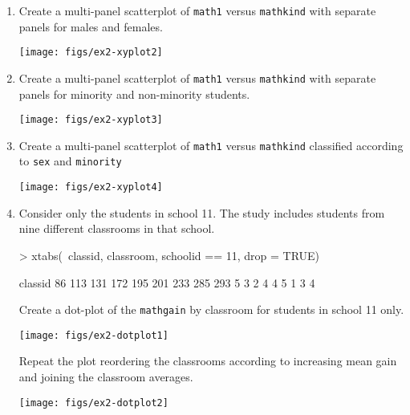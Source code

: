 \documentclass[11pt,a4rpaper]{article}
\newcommand{\code}[1]{\texttt{\small #1}}
\begin{document}
\begin{enumerate}
\item Create a multi-panel scatterplot of \code{math1} versus
  \code{mathkind} with separate panels for males and females.
\begin{center}
\texttt{[image: figs/ex2-xyplot2]}
\end{center}
\item Create a multi-panel scatterplot of \code{math1} versus
  \code{mathkind} with separate panels for minority and non-minority
  students.
\begin{center}
\texttt{[image: figs/ex2-xyplot3]}
\end{center}
\item Create a multi-panel scatterplot of \code{math1} versus
  \code{mathkind} classified according to \code{sex} and \code{minority}
\begin{center}
\texttt{[image: figs/ex2-xyplot4]}
\end{center}
\item Consider only the students in school 11.  The study includes
  students from nine different classrooms in that school.
\begin{Schunk}
\begin{Sinput}
> xtabs(~classid, classroom, schoolid == 11, drop = TRUE)
\end{Sinput}
\begin{Soutput}
classid
 86 113 131 172 195 201 233 285 293 
  5   3   2   4   4   5   1   3   4 
\end{Soutput}
\end{Schunk}
  Create a dot-plot of the \code{mathgain} by classroom for students
  in school 11 only.
  \begin{center}
\texttt{[image: figs/ex2-dotplot1]}
  \end{center}
  Repeat the plot reordering the classrooms according to increasing
  mean gain and joining the classroom averages.
  \begin{center}
\texttt{[image: figs/ex2-dotplot2]}
  \end{center}
\end{enumerate}
\end{document}
